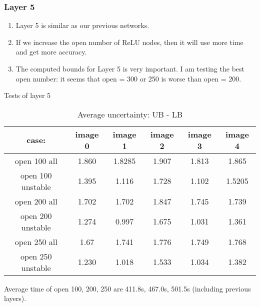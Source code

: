 \documentclass[10pt,table, UTF8]{beamer}
\theoremstyle{mydef}
\numberwithin{equation}{section}
\begin{document}
\begin{frame}
	\frametitle{Layer 5}
	
	
	\begin{enumerate}
		\item Layer 5 is similar as our previous networks.
		
		\vspace*{2ex}
		
		\item  If we increase the open number of ReLU nodes, then it will use more time and get more accuracy.
		
		
		\vspace*{2ex}
		
		\item  The computed bounds for Layer 5 is very important. I am testing the best open number: it seems that open = 300 or 250 is worse than open = 200.
	\end{enumerate}
	
	
\end{frame}

\begin{frame}{Tests of layer 5}
	\begin{table}[htbp]
		\centering
		\caption{Average uncertainty: UB - LB}
		\begin{tabular}{|c|c|c|c|c|c|}
			\hline
			case: &image 0 & image 1 & image 2 & image 3 & image 4 \\
			\hline
			open 100 all & 1.860 & 1.8285 & 1.907 & 1.813 & 1.865 \\
			open 100 unstable & 1.395 & 1.116 & 1.728 & 1.102 & 1.5205 \\
			\hline
			open 200 all & 1.702 & 1.702 & 1.847 & 1.745 & 1.739 \\
			open 200 unstable & 1.274 & 0.997 & 1.675 & 1.031 & 1.361 \\
			\hline
			open 250 all & 1.67 & 1.741 & 1.776 & 1.749 & 1.768\\
			open 250 unstable & 1.230 & 1.018 & 1.533 & 1.034 & 1.382 \\
			\hline
		\end{tabular}
	\end{table}
	
	Average time of open 100, 200, 250 are 411.8s, 467.0s,  501.5s (including previous layers).

\end{frame}
\end{document}
